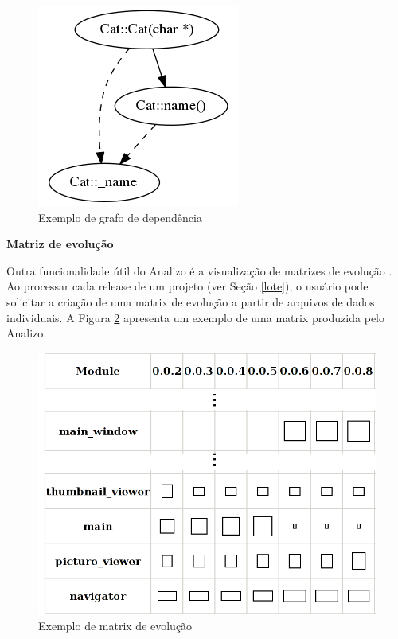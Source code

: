\begin{figure}[h]
\center
\includegraphics[scale=0.4]{imagens/sample-graph.png}
\caption{Exemplo de grafo de dependência}
\label{sample-graph}
\end{figure}

{\bf Matriz de evolução}

Outra funcionalidade útil do Analizo é a visualização de matrizes de evolução
\cite{Lanza2001}. Ao processar cada release de um projeto (ver Seção
\ref{lote}), o usuário pode solicitar a criação de uma matrix de evolução a
partir de arquivos de dados individuais. A Figura \ref{sample-evolution-matrix}
apresenta um exemplo de uma matrix produzida pelo Analizo.

\begin{figure}[h]
\center
\includegraphics[scale=0.2]{imagens/sample-evolution-matrix.png}
\caption{Exemplo de matrix de evolução}
\label{sample-evolution-matrix}
\end{figure}

